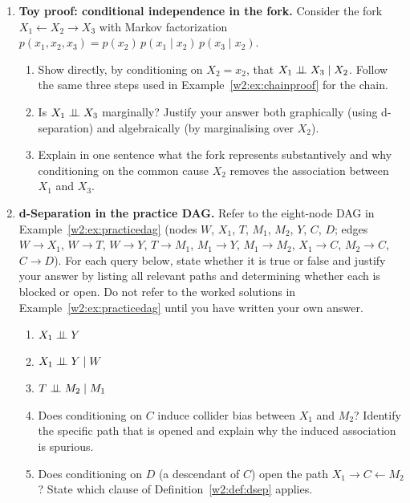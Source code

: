 \documentclass[master.tex]{subfiles}
\begin{document}
\begin{enumerate}[label=\textbf{\arabic*.}, leftmargin=*, itemsep=10pt]
  \item \textbf{Toy proof: conditional independence in the fork.}
  Consider the fork $X_1 \leftarrow X_2 \to X_3$ with Markov factorization
  $p(x_1, x_2, x_3) = p(x_2)\,p(x_1 \mid x_2)\,p(x_3 \mid x_2)$.
  \begin{enumerate}[label=(\alph*)]
    \item Show directly, by conditioning on $X_2 = x_2$, that
          $X_1 \perp\!\!\!\perp X_3 \mid X_2$.  Follow the same three steps used in
          Example~\ref{w2:ex:chainproof} for the chain.
    \item Is $X_1 \perp\!\!\!\perp X_3$ marginally?  Justify your answer both
          graphically (using d-separation) and algebraically (by
          marginalising over $X_2$).
    \item Explain in one sentence what the fork represents substantively
          and why conditioning on the common cause $X_2$ removes the
          association between $X_1$ and $X_3$.
  \end{enumerate}

  \item \textbf{d-Separation in the practice DAG.}
  Refer to the eight-node DAG in Example~\ref{w2:ex:practicedag}
  (nodes $W$, $X_1$, $T$, $M_1$, $M_2$, $Y$, $C$, $D$;
  edges $W \to X_1$, $W \to T$, $W \to Y$, $T \to M_1$, $M_1 \to Y$,
  $M_1 \to M_2$, $X_1 \to C$, $M_2 \to C$, $C \to D$).
  For each query below, state whether it is true or false and justify
  your answer by listing all relevant paths and determining whether each
  is blocked or open.  Do not refer to the worked solutions in
  Example~\ref{w2:ex:practicedag} until you have written your own answer.
  \begin{enumerate}[label=(\alph*)]
    \item $X_1 \perp\!\!\!\perp Y$
    \item $X_1 \perp\!\!\!\perp Y \mid W$
    \item $T \perp\!\!\!\perp M_2 \mid M_1$
    \item Does conditioning on $C$ induce collider bias between $X_1$
          and $M_2$?  Identify the specific path that is opened and explain
          why the induced association is spurious.
    \item Does conditioning on $D$ (a descendant of $C$) open the path
          $X_1 \to C \leftarrow M_2$?  State which clause of
          Definition~\ref{w2:def:dsep} applies.
  \end{enumerate}

\end{enumerate}

\newpage
\ifSubfilesClassLoaded{
  
  
}{}
\end{document}
